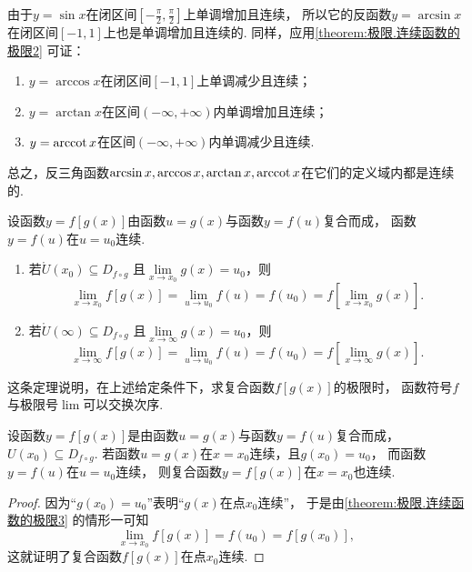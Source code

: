 \begin{example}
由于\(y=\sin x\)在闭区间\(\left[-\frac{\pi}{2},\frac{\pi}{2}\right]\)上单调增加且连续，
所以它的反函数\(y=\arcsin x\)在闭区间\([-1,1]\)上也是单调增加且连续的.
同样，应用\cref{theorem:极限.连续函数的极限2} 可证：
\begin{enumerate}
	\item \(y=\arccos x\)在闭区间\([-1,1]\)上单调减少且连续；
	\item \(y=\arctan x\)在区间\((-\infty,+\infty)\)内单调增加且连续；
	\item \(y=\arccot x\)在区间\((-\infty,+\infty)\)内单调减少且连续.
\end{enumerate}
总之，反三角函数\(\arcsin x,\arccos x,\arctan x,\arccot x\)在它们的定义域内都是连续的.
\end{example}

\begin{theorem}\label{theorem:极限.连续函数的极限3}
\def\D{D_{f \circ g}}
设函数\(y = f[g(x)]\)由函数\(u = g(x)\)与函数\(y = f(u)\)复合而成，
函数\(y = f(u)\)在\(u = u_0\)连续.
\begin{enumerate}
	\item 若\(\mathring{U}(x_0) \subseteq \D\)
	且\(\lim\limits_{x \to x_0}g(x) = u_0\)，则\[
		\lim\limits_{x \to x_0}f[g(x)]
		= \lim\limits_{u \to u_0}f(u) = f(u_0)
		= f\left[ \lim\limits_{x \to x_0} g(x) \right].
	\]

	\item 若\(\mathring{U}(\infty) \subseteq \D\)
	且\(\lim\limits_{x\to\infty}g(x) = u_0\)，则\[
		\lim\limits_{x \to \infty}f[g(x)]
		= \lim\limits_{u \to u_0}f(u) = f(u_0)
		= f\left[ \lim\limits_{x \to \infty} g(x) \right].
	\]
\end{enumerate}
\end{theorem}
这条定理说明，在上述给定条件下，求复合函数\(f[g(x)]\)的极限时，
函数符号\(f\)与极限号\(\lim\)可以交换次序.

\begin{theorem}\label{theorem:极限.连续函数的极限4}
设函数\(y = f[g(x)]\)是由函数\(u = g(x)\)与函数\(y = f(u)\)复合而成，
\(U(x_0) \subseteq D_{f \circ g}\).
若函数\(u = g(x)\)在\(x = x_0\)连续，且\(g(x_0) = u_0\)，
而函数\(y = f(u)\)在\(u = u_0\)连续，
则复合函数\(y = f[g(x)]\)在\(x = x_0\)也连续.
\begin{proof}
因为“\(g(x_0) = u_0\)”表明“\(g(x)\)在点\(x_0\)连续”，
于是由\cref{theorem:极限.连续函数的极限3} 的情形一可知\[
	\lim\limits_{x \to x_0}f[g(x)]
	= f(u_0) = f[g(x_0)],
\]
这就证明了复合函数\(f[g(x)]\)在点\(x_0\)连续.
\end{proof}
\end{theorem}

